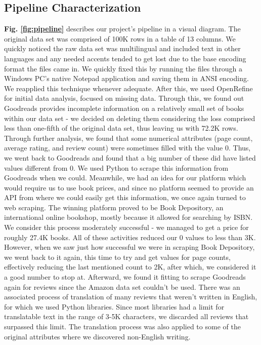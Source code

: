 \documentclass[conference]{IEEEtran}
\begin{document}
\subsection{Pipeline Characterization}
\textbf{Fig. \ref{fig:pipeline}} describes our project's pipeline in a visual diagram.\newline
The original data set was comprised of 100K rows in a table of 13 columns. We quickly noticed the raw data set was multilingual and included text in other languages and any needed accents tended to get lost due to the base encoding format the files came in. We quickly fixed this by running the files through a Windows PC's native Notepad application and saving them in ANSI encoding. We reapplied this technique whenever adequate. \newline
After this, we used OpenRefine for initial data analysis, focused on missing data. Through this, we found out Goodreads provides incomplete information on a relatively small set of books within our data set - we decided on deleting them considering the loss comprised less than one-fifth of the original data set, thus leaving us with 72.2K rows. \newline
Through further analysis, we found that some numerical attributes (page count, average rating, and review count) were sometimes filled with the value 0. Thus, we went back to Goodreads and found that a big number of these did have listed values different from 0. We used Python to scrape this information from Goodreads when we could. \newline
Meanwhile, we had an idea for our platform which would require us to use book prices, and since no platform seemed to provide an API from where we could easily get this information, we once again turned to web scraping. The winning platform proved to be Book Depository, an international online bookshop, mostly because it allowed for searching by ISBN. We consider this process moderately successful - we managed to get a price for roughly 27.4K books. \newline
All of these activities reduced our 0 values to less than 3K. However, when we saw just how successful we were in scraping Book Depository, we went back to it again, this time to try and get values for page counts, effectively reducing the last mentioned count to 2K, after which, we considered it a good number to stop at. \newline
Afterward, we found it fitting to scrape Goodreads again for reviews since the Amazon data set couldn't be used. There was an associated process of translation of many reviews that weren't written in English, for which we used Python libraries. Since most libraries had a limit for translatable text in the range of 3-5K characters, we discarded all reviews that surpassed this limit. The translation process was also applied to some of the original attributes where we discovered non-English writing. \newline
\end{document}

